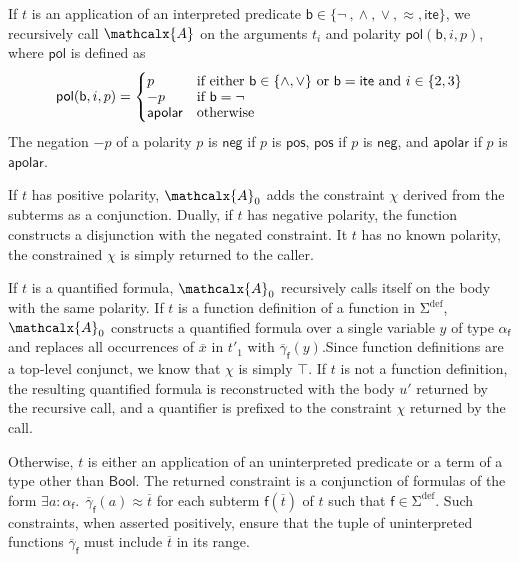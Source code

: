 \documentclass[runningheads,a4paper]{llncs}
\newcommand\pnegate{-}
\newcommand{\con}[1]{\mathsf{#1}}
\renewcommand\vec[1]{\overline{#1}}
\let\oldSigma=\Sigma
\def\Sigma{\mathrm{\oldSigma}}
\let\oldneg=\neg
\def\neg{\oldneg\:}
\let\oldvee=\vee
\def\vee{\mathrel{\oldvee}}
\let\oldwedge=\wedge
\def\wedge{\mathrel{\oldwedge}}
\newcommand{\teq}{\approx}
\newcommand{\conv}{\mathcalx{A}}
\newcommand{\sfundefs}[1]{#1^\mathrm{def}}
\newcommand{\pnone}{\con{apolar}}
\newcommand{\ppos}{\con{pos}}
\newcommand{\pneg}{\con{neg}}
\newcommand{\pol}{\con{pol}}
\newcommand\ty[1]{\con{#1}}
\newcommand{\Bool}{\ty{Bool}}
\newcommand{\ltrue}{\top}
\newcommand{\lite}{\con{ite}}
\newcommand\concret{\gamma} %
\newcommand{\boolop}{\con{b}}
\newcommand{\vecfarg}[1]{\vec{\concret}_{#1}}
\newcommand{\fargsort}[1]{\alpha_{#1}}
\begin{document}
If $t$ is an application of an interpreted predicate $\boolop
\in \{{\neg}, {\wedge}, {\vee}, {\teq}, {\lite}\}$,
we recursively call $\conv$ on the arguments $t_i$ and polarity $\pol( \boolop,
i, p )$, where $\pol$ is defined as
\begin{equation*}
\pol( \boolop, i, p ) =
\begin{cases}
p & \text{if either $\boolop \in \{{\wedge}, {\vee}\}$ or $\boolop = \lite$ and $i \in \{2, 3\}$} \\[-\jot]
\pnegate p & \text{if $\boolop = {\neg}$} \\[-\jot]
\pnone & \text{otherwise}
\end{cases}
\end{equation*}
The negation $\pnegate p$ of a polarity $p$ is $\pneg$ if $p$ is $\ppos$, $\ppos$
if $p$ is $\pneg$, and $\pnone$ if $p$ is $\pnone$.

If $t$ has positive polarity, $\conv_0$ adds the constraint $\chi$ derived from
the subterms as a conjunction. Dually, if $t$ has negative polarity, the
function constructs a disjunction with the negated constraint. It $t$ has no
known polarity, the constrained $\chi$ is simply returned to the caller.

If $t$ is a quantified formula, $\conv_0$ recursively calls itself on the body
with the same polarity. If $t$ is a function definition of a function in
$\sfundefs{\Sigma}$, $\conv_0$ constructs a quantified formula over a single variable
$y$ of type $\fargsort{\con{f}}$ and replaces all occurrences of $\vec x$ in
$t'_1$ with $\vecfarg{\con{f}}( y )$.Since function definitions
are a top-level conjunct, %
we know that $\chi$ is simply $\ltrue$.
If $t$ is not a function definition, the resulting
quantified formula is reconstructed with the body $u'$ returned by the
recursive call, and a quantifier is prefixed to the constraint $\chi$
returned by the call.

Otherwise, $t$ is either an application of an uninterpreted predicate or a term
of a type other than $\Bool$. The returned constraint is a conjunction of
formulas of the form $\exists a : {\fargsort{\con{f}}}.\;\, \vecfarg{\con{f}}(
a ) \teq \vec t$ for each subterm $\con{f}( \vec t )$ of $t$ such that $\con{f}
\in \sfundefs{\Sigma}$. Such constraints, when asserted positively, ensure that
the tuple of uninterpreted functions $\vecfarg{\con{f}}$ must include $\vec t$
in its range.

\end{document}
